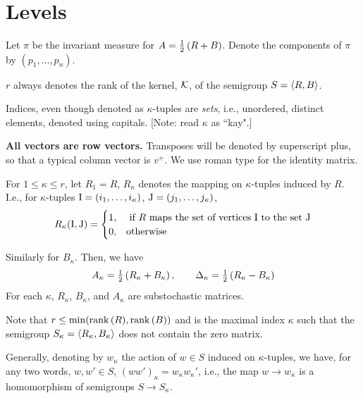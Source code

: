 


\section{Levels}
\label{sec:7.2}  %

Let $\pi$ be the invariant measure for $A=\tfrac{1}{2}\,(R+B)$. Denote the components of 
$\pi$ by $(p_1,\ldots,p_n)$.

$r$ always denotes the rank of the kernel, ${\mathcal K}$, of the semigroup $S=\avg R,B.$.\par
Indices, even though denoted as $\kappa$-tuples are {\it sets\/}, i.e., unordered, distinct elements,
denoted using capitals. [Note: read $\kappa$ as ``kay".] 

{\bf All vectors are row vectors. } Transposes will be denoted by superscript plus, so
that a typical column vector is $v^+$. We use roman type for the identity matrix.


For $1\le \kappa \le r$, let $R_1=R$, $R_\kappa$ denotes the mapping on $\kappa$-tuples induced
by $R$. 
I.e., for $\kappa$-tuples ${\rm I}=(i_1,\ldots,i_\kappa)$, ${\rm J}=(j_1,\ldots,j_\kappa)$,
$$
  R_\kappa({\rm I},{\rm J})=\begin{cases} 
	1,& \text{ if } R \text{ maps the set of vertices } 
			{\rm I}  \text{ to the set } {\rm J} \cr
        0, & \text{otherwise}\cr \end{cases}
$$

Similarly for $B_\kappa$. 
Then, we have 
$$ 
  A_\kappa=\tfrac{1}{2}\,(R_\kappa+B_\kappa)\,,\qquad \Delta_\kappa
	=\tfrac{1}{2}\,(R_\kappa-B_\kappa)
$$
For each $\kappa$, $R_\kappa$, $B_\kappa$, and $A_\kappa$ are substochastic matrices.

Note that $r\le \min({\rm rank}\,(R),{\rm rank}\,(B))$ and is the maximal index $\kappa$ such that the semigroup $S_\kappa=\avg R_\kappa,B_\kappa.$ does not contain the zero matrix.

Generally, denoting by $w_\kappa$ the action of $w\in S$ induced on $\kappa$-tuples, we have, for any two words,
$w,w'\in S$, $(ww')_\kappa=w_\kappa w_\kappa'$, i.e., the map $w\to w_\kappa$ is a homomorphism of semigroups
$S\to S_\kappa$.
